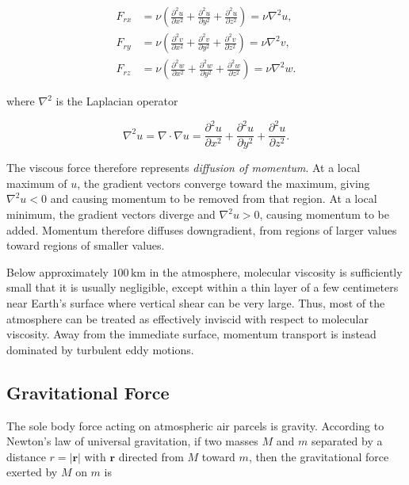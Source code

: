 \documentclass[10pt,twocolumn]{memoir}
\begin{document}
\begin{equation}
\begin{aligned}
    F_{rx}
    &= \nu\left(\frac{\partial^2 u}{\partial x^2} + \frac{\partial^2 u}{\partial y^2} + \frac{\partial^2 u}{\partial z^2}\right) = \nu\nabla^2u, \\
    F_{ry}
    &= \nu\left(\frac{\partial^2 v}{\partial x^2} + \frac{\partial^2 v}{\partial y^2} + \frac{\partial^2 v}{\partial z^2}\right) = \nu\nabla^2v, \\
    F_{rz}
    &= \nu\left(\frac{\partial^2 w}{\partial x^2} + \frac{\partial^2 w}{\partial y^2} + \frac{\partial^2 w}{\partial z^2}\right) = \nu\nabla^2w.
\end{aligned}
\end{equation}

where $\nabla^2$ is the Laplacian operator

\begin{equation}
    \nabla^2 u = \nabla\cdot\nabla u = \frac{\partial^2u}{\partial x^2} + \frac{\partial^2u}{\partial y^2} + \frac{\partial^2u}{\partial z^2}.
\end{equation}

The viscous force therefore represents \textit{diffusion of momentum}. At a local maximum of $u$, the gradient vectors converge toward the maximum, giving $\nabla^2u<0$ and causing momentum to be removed from that region. At a local minimum, the gradient vectors diverge and $\nabla^2u>0$, causing momentum to be added. Momentum therefore diffuses downgradient, from regions of larger values toward regions of smaller values.

Below approximately $100\,\mathrm{km}$ in the atmosphere, molecular viscosity is sufficiently small that it is usually negligible, except within a thin layer of a few centimeters near Earth's surface where vertical shear can be very large. Thus, most of the atmosphere can be treated as effectively inviscid with respect to molecular viscosity. Away from the immediate surface, momentum transport is instead dominated by turbulent eddy motions.

\subsection{Gravitational Force}

The sole body force acting on atmospheric air parcels is gravity. According to Newton's law of universal gravitation, if two masses $M$ and $m$ separated by a distance $r=|\mathbf{r}|$ with $\mathbf{r}$ directed from $M$ toward $m$, then the gravitational force exerted by $M$ on $m$ is
\end{document}
